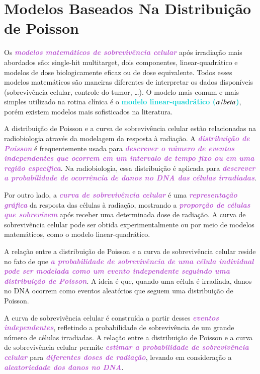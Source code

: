 \documentclass[11pt,a4paper]{article}
\begin{document}
\section{Modelos Baseados Na Distribuição de Poisson}

	Os \textcolor{MediumOrchid}{\textbf{\textit{modelos matemáticos de sobrevivência celular}}} após irradiação mais abordados são: single-hit multitarget, dois componentes, linear-quadrático e modelos de dose biologicamente eficaz ou de dose equivalente. Todos esses modelos matemáticos são maneiras diferentes de interpretar os dados disponíveis (sobrevivência celular, controle do tumor, \dots). O modelo mais comum e mais simples utilizado na rotina clínica é o \textcolor{DarkTurquoise}{\large\LobsterTwo\textbf{modelo linear-quadrático ($\mathbf\mathrm{\alpha/beta}$)}}, porém existem modelos mais sofisticados na literatura. 

	A distribuição de Poisson e a curva de sobrevivência celular estão relacionadas na radiobiologia através da modelagem da resposta à radiação. A \textcolor{MediumOrchid}{\textbf{\textit{distribuição de Poisson}}} é frequentemente usada para \textcolor{MediumOrchid}{\textbf{\textit{descrever o número de eventos independentes que ocorrem em um intervalo de tempo fixo ou em uma região específica}}}. Na radiobiologia, essa distribuição é aplicada para \textcolor{MediumOrchid}{\textbf{\textit{descrever a probabilidade de ocorrência de danos no DNA das células irradiadas}}}.

	Por outro lado, a \textcolor{MediumOrchid}{\textbf{\textit{curva de sobrevivência celular}}} é uma \textcolor{MediumOrchid}{\textbf{\textit{representação gráfica}}} da resposta das células à radiação, mostrando a \textcolor{MediumOrchid}{\textbf{\textit{proporção de células que sobrevivem}}} após receber uma determinada dose de radiação. A curva de sobrevivência celular pode ser obtida experimentalmente ou por meio de modelos matemáticos, como o modelo linear-quadrático. 

	A relação entre a distribuição de Poisson e a curva de sobrevivência celular reside no fato de que \textcolor{MediumOrchid}{\textbf{\textit{a probabilidade de sobrevivência de uma célula individual pode ser modelada como um evento independente seguindo uma distribuição de Poisson}}}. A ideia é que, quando uma célula é irradiada, danos no DNA ocorrem como eventos aleatórios que seguem uma distribuição de Poisson.

	A curva de sobrevivência celular é construída a partir desses \textcolor{MediumOrchid}{\textbf{\textit{eventos independentes}}}, refletindo a probabilidade de sobrevivência de um grande número de células irradiadas. A relação entre a distribuição de Poisson e a curva de sobrevivência celular permite \textcolor{MediumOrchid}{\textbf{\textit{estimar a probabilidade de sobrevivência celular}}} para \textcolor{MediumOrchid}{\textbf{\textit{diferentes doses de radiação}}}, levando em consideração a \textcolor{MediumOrchid}{\textbf{\textit{aleatoriedade dos danos no DNA}}}.
\end{document}
